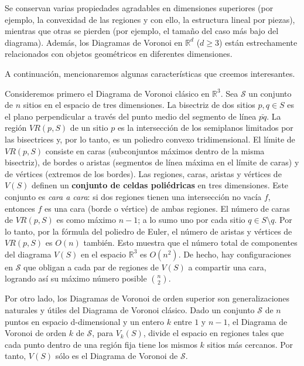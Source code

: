 Se conservan varias propiedades agradables en dimensiones superiores (por ejemplo, la convexidad de las regiones y con ello, la estructura lineal por piezas), mientras que otras se pierden (por ejemplo, el tamaño del caso más bajo del diagrama). Además, los Diagramas de Voronoi en $\mathbb{R}^d$ ($d \geq3$) están estrechamente relacionados con objetos geométricos en diferentes dimensiones. \vspace{0.3cm}

A continuación, mencionaremos algunas características que creemos interesantes.
 \vspace{0.3cm}
 
Consideremos primero el Diagrama de Voronoi clásico en $\mathbb{R}^3$. Sea $\mathcal{S}$ un conjunto de $n$ sitios en el espacio de tres dimensiones. La bisectriz de dos sitios $p,q \in S$ es el plano perpendicular a través del punto medio del segmento de línea $\bar{pq}$. La región $VR(p,S)$ de un sitio $p$ es la intersección de los semiplanos limitados por las bisectrices y, por lo tanto, es un poliedro convexo tridimensional. El límite de $VR(p,S)$ consiste en caras (subconjuntos máximos dentro de la misma bisectriz), de bordes o aristas (segmentos de línea máxima en el límite de caras) y de vértices (extremos de los bordes).
Las regiones, caras, aristas y vértices de $V(S)$ definen un \textbf{conjunto de celdas poliédricas} en tres dimensiones. Este conjunto es \textit{cara a cara}: si dos regiones tienen una intersección no vacía $f$, entonces $f$ es una cara (borde o vértice) de ambas regiones.
El número de caras de $VR(p,S)$ es como máximo $n-1$; a lo sumo uno por cada sitio $q \in S \setminus {q}$. Por lo tanto, por la fórmula del poliedro de Euler, el número de aristas y vértices de $VR(p,S)$ es $O(n)$ también. Esto muestra que el número total de componentes del diagrama $V(S)$ en el espacio $\mathbb{R}^3$ es $O(n^2)$. De hecho, hay configuraciones en $\mathcal{S}$ que obligan a cada par de regiones de $V(S)$ a compartir una cara, logrando así su máximo número posible ${n \choose 2}$.
\vspace{0.3cm}

Por otro lado, los Diagramas de Voronoi de orden superior son generalizaciones naturales y útiles del Diagrama de Voronoi clásico. Dado un conjunto $\mathcal{S}$ de $n$ puntos en espacio d-dimensional y un entero $k$ entre $1$ y $n-1$, el Diagrama de Voronoi de orden $k$ de $\mathcal{S}$, para $V_{k}(S)$, divide el espacio en regiones tales que cada punto dentro de una región fija tiene los mismos $k$ sitios más cercanos. Por tanto, $V(S)$ sólo es el Diagrama de Voronoi de $\mathcal{S}$.
\vspace{0.3cm}


